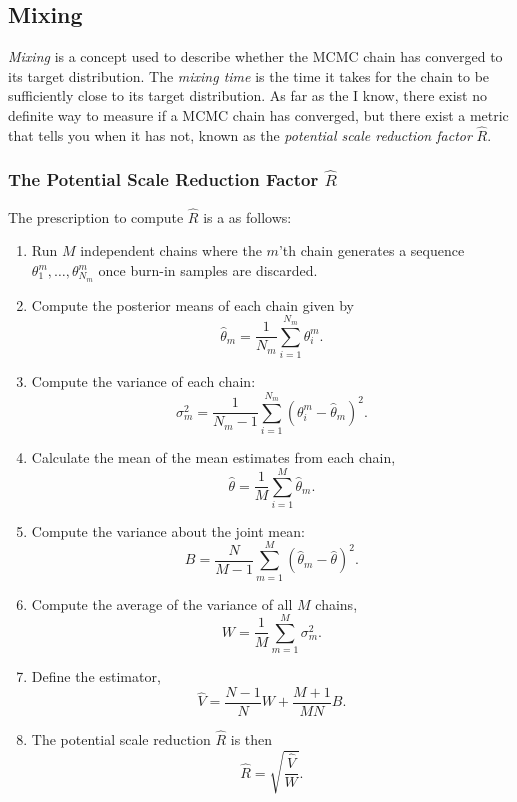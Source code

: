 \subsection{Mixing}
\textit{Mixing} is a concept used to describe whether the MCMC chain has converged to its target distribution. The \textit{mixing time} is the time it takes for the chain to be sufficiently close to its target distribution. As far as the I know, there exist no definite way to measure if a MCMC chain has converged, but there exist a metric that tells you when it has not, known as the \textit{potential scale reduction factor} $\hat{R}$.
\subsubsection{The Potential Scale Reduction Factor $\hat{R}$}
The prescription to compute $\hat{R}$ is a as follows: 
\begin{enumerate}
  \item Run $M$ independent chains where the $m$'th chain generates a sequence $\theta_1^m, \ldots, \theta_{N_m}^m$ once burn-in samples are discarded.
  \item Compute the posterior means of each chain given by
  \begin{equation}
    \hat{\theta}_m = \frac{1}{N_m}\sum_{i=1}^{N_m} \theta_i^m.
  \end{equation}
  \item Compute the variance of each chain:
  \begin{equation}
    \sigma_m^2 = \frac{1}{N_m - 1}\sum_{i=1}^{N_m}(\theta_i^m - \hat{\theta}_m)^2.
  \end{equation}
  \item Calculate the mean of the mean estimates from each chain,
  \begin{equation}
    \hat{\theta} = \frac{1}{M}\sum_{i=1}^M \hat{\theta}_m.
  \end{equation}
  \item Compute the variance about the joint mean:
  \begin{equation}
    B = \frac{N}{M-1}\sum_{m=1}^M (\hat{\theta}_m - \hat{\theta})^2.
  \end{equation}
  \item Compute the average of the variance of all $M$ chains,
  \begin{equation}
    W = \frac{1}{M}\sum_{m=1}^M \sigma_m^2.
  \end{equation}
  \item Define the estimator,
  \begin{equation}
    \hat{V} = \frac{N-1}{N}W + \frac{M+1}{MN}B.
  \end{equation}
  \item The potential scale reduction $\hat{R}$ is then
  \begin{equation}
    \hat{R} = \sqrt{\frac{\hat{V}}{W}}.
  \end{equation} 
\end{enumerate}

